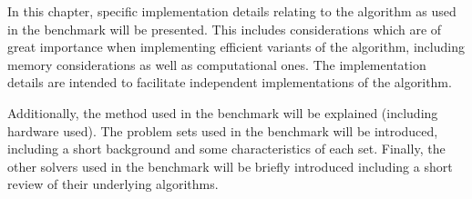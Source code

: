 In this chapter, specific implementation details relating to the algorithm as used in the benchmark will be presented.
This includes considerations which are of great importance when implementing efficient variants of the algorithm, including memory considerations as well as computational ones.
The implementation details are intended to facilitate independent implementations of the algorithm.

Additionally, the method used in the benchmark will be explained (including hardware used).
The problem sets used in the benchmark will be introduced, including a short background and some characteristics of each set.
Finally, the other solvers used in the benchmark will be briefly introduced including a short review of their underlying algorithms.
